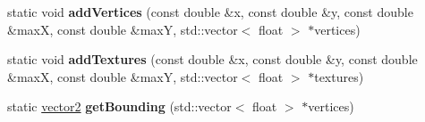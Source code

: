 \begin{DoxyCompactItemize}
static void {\bfseries add\+Vertices} (const double \&x, const double \&y, const double \&maxX, const double \&maxY, std\+::vector$<$ float $>$ $\ast$vertices)
\item 
\mbox{\label{classflounder_1_1text_abcc508866b5abe3aef2e9a6b6dac1dad}} 
static void {\bfseries add\+Textures} (const double \&x, const double \&y, const double \&maxX, const double \&maxY, std\+::vector$<$ float $>$ $\ast$textures)
\item 
\mbox{\label{classflounder_1_1text_abb29d8dfd44687edc330265e447d54af}} 
static \hyperlink{classflounder_1_1vector2}{vector2} {\bfseries get\+Bounding} (std\+::vector$<$ float $>$ $\ast$vertices)
\end{DoxyCompactItemize}
